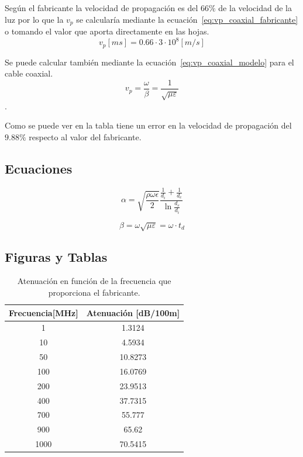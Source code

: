 \documentclass[10pt,conference,a4paper]{IEEEtran}
\begin{document}
Según el fabricante la velocidad de propagación es del $66 \%$ de la velocidad de la luz por lo que la $v_p$ se calcularía mediante la ecuación~\ref{eq:vp_coaxial_fabricante} o tomando el valor que aporta directamente en las hojas.
\begin{equation}
    \label{eq:vp_coaxial_fabricante}
    v_p [ms] = 0.66 \cdot 3 \cdot 10^8 [m/s]
\end{equation}

Se puede calcular también mediante la ecuación~\ref{eq:vp_coaxial_modelo} para el cable coaxial. 
\begin{equation}
    \label{eq:vp_coaxial_modelo}
    v_p = \frac{\omega}{\beta} = \frac{1}{\sqrt{\mu \varepsilon}}
\end{equation}.

Como se puede ver en la tabla tiene un error en la velocidad de propagación del $9.88 \%$ respecto al valor del fabricante. 

\subsection{Ecuaciones}

\begin{equation}
    \label{eq:atenuacion_coaxial}
    \alpha = \sqrt{\frac{\rho \omega \epsilon}{2}} \frac{\frac{1}{d_i} + \frac{1}{d_e}}{\ln{\frac{d_e}{d_i}}}
\end{equation}

\begin{equation}
    \label{eq:constante_fase_coaxial}
    \beta = \omega \sqrt{\mu \varepsilon} = \omega \cdot t_d
\end{equation}

\subsection{Figuras y Tablas}

\begin{table}[htb]
    \renewcommand{\arraystretch}{1.2}
    \centering
    \begin{tabular}{|c|c|}
	\hline
	Frecuencia[MHz] & Atenuación [dB/100m] \\
	\hline
	1 & 1.3124 \\
	10 & 4.5934 \\
	50 & 10.8273 \\	
	100 & 16.0769 \\
	200 & 23.9513 \\
	400 & 37.7315 \\
	700 & 55.777 \\
	900 & 65.62 \\
	1000 & 70.5415 \\
	\hline
    \end{tabular}
    \caption{Atenuación en función de la frecuencia que proporciona el fabricante.}
    \label{tab:atenuacion_coaxial}
\end{table}
\end{document}
